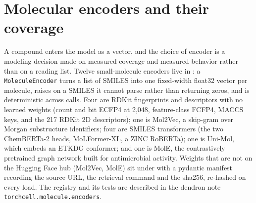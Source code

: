 
\section{Molecular encoders and their coverage}
\label{sec:encoders}

A compound enters the model as a vector, and the choice of encoder is a modeling decision
made on measured coverage and measured behavior rather than on a reading list. Twelve
small-molecule encoders live in : a \texttt{MoleculeEncoder} turns
a list of SMILES into one fixed-width float32 vector per molecule, raises on a SMILES it
cannot parse rather than returning zeros, and is deterministic across calls. Four are RDKit
fingerprints and descriptors with no learned weights (count and bit ECFP4 at 2{,}048,
feature-class FCFP4, MACCS keys, and the 217 RDKit 2D descriptors); one is Mol2Vec, a
skip-gram over Morgan substructure identifiers; four are SMILES transformers (the two
ChemBERTa-2 heads, MoLFormer-XL, a ZINC RoBERTa); one is Uni-Mol, which embeds an ETKDG
conformer; and one is MolE, the contrastively pretrained graph network built for
antimicrobial activity. Weights that are not on the Hugging Face hub (Mol2Vec, MolE) sit under
 with a pydantic manifest recording the source URL, the retrieval command
and the sha256, re-hashed on every load. The registry and its tests are described in the
dendron note \texttt{torchcell.molecule.encoders}.

